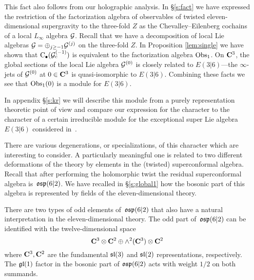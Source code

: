 This fact also follows from our holographic analysis. 
In \S \ref{s:fact} we have expressed the restriction of the factorization algebra of observables of twisted eleven-dimensional supergravity to the three-fold $Z$ as the Chevalley--Eilenberg cochains of a local $L_\infty$ algebra $\mathcal G$. 
Recall that we have a decomposition of local Lie algebras $\mathcal G = \oplus_{j \geq -1} \mathcal G^{(j)}$ on the three-fold $Z$. 
In Proposition \ref{lem:single} we have shown that ${\rm C}_\bullet (\mathcal G_{c}^{(-1)})$ is equivalent to the factorization algebra $\operatorname{Obs}_{1}$.
On $\mathbf{C}^3$, the global sections of the local Lie algebra $\mathcal G^{(0)}$ is closely related to $E(3|6)$---the $\infty$-jets of $\mathcal G^{(0)}$ at $0 \in \mathbf{C}^3$ is quasi-isomorphic to $E(3|6)$.
Combining these facts we see that $\operatorname{Obs}_{1}(0)$ is a module for $E(3|6)$. 

In appendix \S \ref{s:kr} we will describe this module from a purely representation theoretic point of view and compare our expression for the character to the character of a certain irreducible module for the exceptional super Lie algebra $E(3|6)$ considered in~\cite{KR2}.

%
%

\parsec
There are various degenerations, or specializations, of this character which are interesting to consider.
A particularly meaningful one is related to two different deformations of the theory by elements in the (twisted) superconformal algebra.
Recall that after performing the holomorphic twist the residual superconformal algebra is~$\mathfrak{osp}(6|2)$.
We have recalled in \S\ref{s:global1} how the bosonic part of this algebra is represented by fields of the eleven-dimensional theory. 

There are two types of odd elements of~$\mathfrak{osp}(6|2)$ that also have a natural interpretation in the eleven-dimensional theory.
The odd part of~$\mathfrak{osp}(6|2)$ can be identified with the twelve-dimensional space
\[
\mathbf{C}^3 \otimes \mathbf{C}^2 \oplus \wedge^2(\mathbf{C}^3) \otimes \mathbf{C}^2 
\]
where $\mathbf{C}^3, \mathbf{C}^2$ are the fundamental $\mathfrak{sl}(3)$ and $\mathfrak{sl}(2)$ representations, respectively. 
The $\mathfrak{gl}(1)$ factor in the bosonic part of $\mathfrak{osp}(6|2)$ acts with weight $1/2$ on both summands. 


